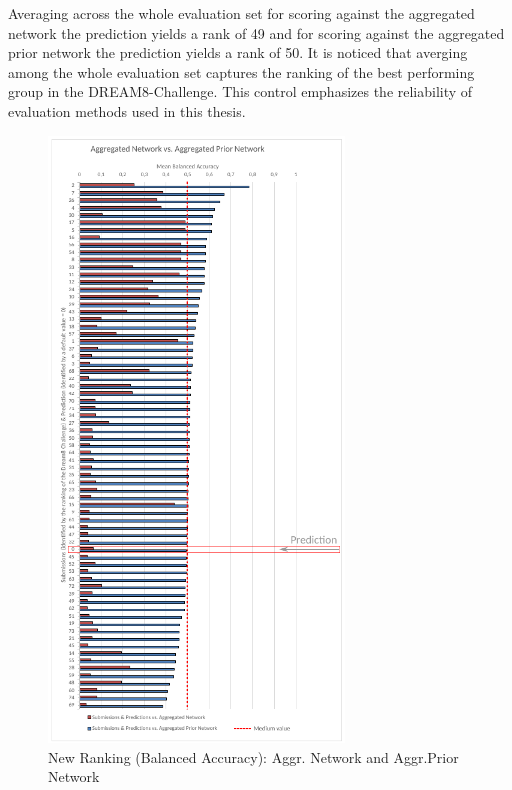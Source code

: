 Averaging across the whole evaluation set for scoring against the aggregated network the prediction  yields a rank of 49 and for scoring against the aggregated prior network the prediction yields a rank of 50.
It is noticed that averging among the whole evaluation set captures the ranking of the best performing group in the DREAM8-Challenge. This control emphasizes the reliability of evaluation methods used in this thesis.

\begin{figure}[H]
\centering
\includegraphics[width=0.7\textwidth]{./Bilder/Scoring/dreamchallenge/Meanbacc_vertical_comparison2.pdf}
\caption[New Ranking Balanced Accuracy]{New Ranking (Balanced Accuracy): Aggr. Network and Aggr.Prior Network}
\label{fig:}
\end{figure}


